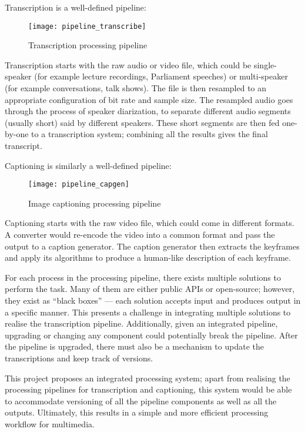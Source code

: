 Transcription is a well-defined pipeline:

\begin{figure}[h]
\begin{center}
    \texttt{[image: pipeline\_transcribe]}
    \caption{Transcription processing pipeline}\label{trans}
\end{center}
\end{figure}

Transcription starts with the raw audio or video file, which could be
single-speaker (for example lecture recordings, Parliament speeches) or
multi-speaker (for example conversations, talk shows). The file is then resampled
to an appropriate configuration of bit rate and sample size. The resampled audio
goes through the process of speaker diarization, to separate different audio
segments (usually short) said by different speakers. These short segments are
then fed one-by-one to a transcription system; combining all the results gives
the final transcript.

Captioning is similarly a well-defined pipeline:

\begin{figure}[h]
\begin{center}
    \texttt{[image: pipeline\_capgen]}
    \caption{Image captioning processing pipeline}
\end{center}
\end{figure}

Captioning starts with the raw video file, which could come in different formats.
A converter would re-encode the video into a common format and pass the output
to a caption generator. The caption generator then extracts the keyframes and
apply its algorithms to produce a human-like description of each keyframe.

For each process in the processing pipeline, there exists multiple solutions
to perform the task. Many of them are either public APIs
or open-source; however, they exist as ``black boxes'' --- each solution accepts
input and produces output in a specific manner. This presents a challenge in
integrating multiple solutions to realise the transcription pipeline.
Additionally, given an integrated pipeline, upgrading or changing any component
could potentially break the pipeline. After the pipeline is upgraded, there must
also be a mechanism to update the transcriptions and keep track of versions. 

This project proposes an integrated processing system; apart from realising
the processing pipelines for transcription and captioning, this system would be
able to accommodate versioning
of all the pipeline components as well as all the outputs. Ultimately, this
results in a simple and more efficient processing workflow for multimedia.

